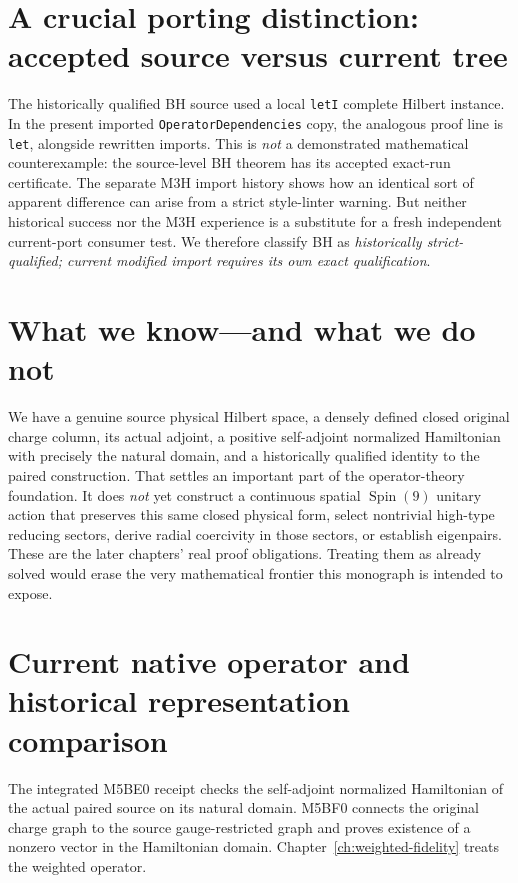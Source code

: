 \section{A crucial porting distinction: accepted source versus current tree}
The historically qualified BH source used a local \texttt{letI} complete
Hilbert instance. In the present imported \texttt{OperatorDependencies}
copy, the analogous proof line is \texttt{let}, alongside rewritten
imports. This is \emph{not} a demonstrated mathematical counterexample:
the source-level BH theorem has its accepted exact-run certificate.
The separate M3H import history shows how an identical sort of apparent
difference can arise from a strict style-linter warning. But neither
historical success nor the M3H experience is a substitute for a fresh
independent current-port consumer test. We therefore classify BH as
\emph{historically strict-qualified; current modified import requires its
own exact qualification}.

\section{What we know---and what we do not}
We have a genuine source physical Hilbert space, a densely defined
closed original charge column, its actual adjoint, a positive
self-adjoint normalized Hamiltonian with precisely the natural domain,
and a historically qualified identity to the paired construction.
That settles an important part of the operator-theory foundation.
It does \emph{not} yet construct a continuous spatial $\operatorname{Spin}(9)$
unitary action that preserves this same closed physical form, select
nontrivial high-type reducing sectors, derive radial coercivity in
those sectors, or establish eigenpairs. These are the later chapters'
real proof obligations. Treating them as already solved would erase
the very mathematical frontier this monograph is intended to expose.

\section{Current native operator and historical representation comparison}
\label{sec:ed08-weighted}
The integrated M5BE0 receipt checks the self-adjoint normalized
Hamiltonian of the actual paired source on its natural domain.
M5BF0 connects the original charge graph to the source gauge-restricted
graph and proves existence of a nonzero vector in the Hamiltonian
domain. Chapter~\ref{ch:weighted-fidelity} treats the weighted operator.

